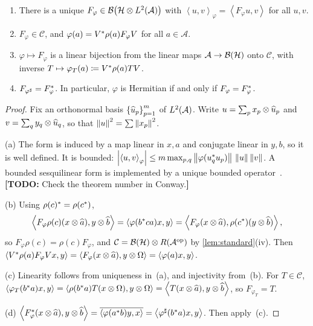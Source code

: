\documentclass[12pt]{article}
\newcommand{\todo}[1]{\textcolor{\mysubcolor}{\small\textbf{[TODO:} #1\textbf{]}}}
\newcommand{\alg}{\mathcal{A}}             %
\newcommand{\hilb}{\mathcal{H}}            %
\newcommand{\bdd}[1]{\mathcal{B}\br{#1}}   %
\newcommand{\op}{^{\mathrm{op}}}           %
\newcommand{\ip}[2]{\left\langle #1 , #2 \right\rangle}
\newcommand{\ipphi}[2]{\left\langle #1 , #2 \right\rangle_{\varphi}}
\newcommand{\Ltwo}{L^2\br{\alg}}
\newcommand{\vect}[1]{\widehat{#1}}
\newcommand{\Ltn}{\hilb \tensor \Ltwo}
\newcommand{\Fphi}{F_{\varphi}}
\newcommand{\comm}{\mathcal{C}}            %
\begin{document}
\begin{theorem}
\label{thm:linear}
\begin{enumerate}[label=(\alph*)]
  \item \label{it:exists}
    There is a unique \(\Fphi \in \bdd{\Ltn}\) with
    \(\ipphi uv = \ip{\Fphi u}{v}\) for all \(u, v\).
  \item \label{it:comm}
    \(\Fphi \in \comm\), and
    \(\varphi(a) = V^\adjoint\rho(a)\Fphi V\) for all \(a \in \alg\).
  \item \label{it:bij}
    \(\varphi \mapsto \Fphi\) is a linear bijection from the linear maps
    \(\alg \to \bdd\hilb\) onto \(\comm\), with inverse
    \(T \mapsto \varphi_T(a) \coloneqq V^*\rho(a)TV\).
  \item \label{it:adj}
    \(F_{\varphi^\sharp} = \Fphi^\adjoint\). In particular, \(\varphi\) is
    Hermitian if and only if \(\Fphi = \Fphi^\adjoint\).
\end{enumerate}
\end{theorem}
\begin{proof}
Fix an orthonormal basis \(\set{\vect{u}_p}_{p=1}^m\) of \(\Ltwo\). Write
\(u = \sum_p x_p \tensor \vect u_p\) and \(v = \sum_q y_q \tensor \vect u_q\), so
that \(\left\| u \right\|^2 = \sum\left\| x_p \right\|^2\).

(a) The form is induced by a map linear in \(x, a\) and conjugate linear in
\(y, b\), so it is well defined. It is bounded:
\(\abs{\ipphi uv} \le m\max_{p,q}\norm{\varphi(u_q^\adjoint u_p)}\,\norm u\norm v\).
A bounded sesquilinear form is implemented by a unique bounded
operator~\cite[Theorem~II.2.2]{Conway1990}. \todo{Check the theorem number in
Conway.}

(b) Using \(\rho(c)^* = \rho(c^*)\),
\[
  \ip{\Fphi\rho(c)(x \tensor \vect a)}{y \tensor \vect b}
  = \ip{\varphi(b^\adjoint ca)x}{y}
  = \ip{\Fphi(x \tensor \vect a)}{\rho(c^\adjoint)(y \tensor \vect b)},
\]
so \(\Fphi\rho(c) = \rho(c)\Fphi\), and \(\comm = \bdd\hilb \tensor R(\alg\op)\)
by \cref{lem:standard}(iv). Then
\(\ip{V^\adjoint\rho(a)\Fphi Vx}{y} = \ip{\Fphi(x \tensor \vect a)}{y \tensor \Omega}
= \ip{\varphi(a)x}{y}\).

(c) Linearity follows from uniqueness in~(a), and injectivity from~(b). For
\(T \in \comm\),
\(\ip{\varphi_T(b^\adjoint a)x}{y}
= \ip{\rho(b^\adjoint a)T(x \tensor \Omega)}{y \tensor \Omega}
= \ip{T(x \tensor \vect a)}{y \tensor \vect b}\), so \(F_{\varphi_T} = T\).

(d) \(\ip{\Fphi^\adjoint(x \tensor \vect a)}{y \tensor \vect b}
= \overline{\ip{\varphi(a^\adjoint b)y}{x}}
= \ip{\varphi^\sharp(b^\adjoint a)x}{y}\). Then apply~(c).
\end{proof}
\end{document}
